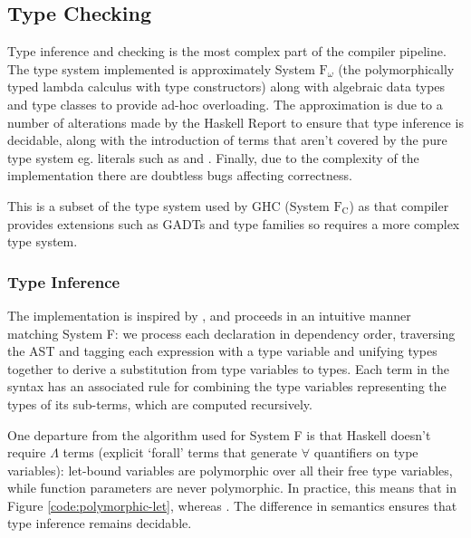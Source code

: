 \documentclass[dissertation.tex]{subfiles}
\begin{document}
{{{\begin{itemize}
{            }
            \end{itemize}

        }
    }
    \subsection{Type Checking}
    {

        Type inference and checking is the most complex part of the compiler pipeline. The type system implemented is
        approximately System \(\text{F}_\omega\) (the polymorphically typed lambda calculus with type constructors)
        along with algebraic data types and type classes to provide ad-hoc overloading. The approximation is due to a
        number of alterations made by the Haskell Report to ensure that type inference is decidable, along with the
        introduction of terms that aren't covered by the pure type system eg. literals such as  and
        . Finally, due to the complexity of the implementation there are doubtless bugs affecting
        correctness.
        
        This is a subset of the type system used by GHC (System \(\text{F}_\text{C}\)) as that compiler provides
        extensions such as GADTs and type families so requires a more complex type system.


        \subsubsection{Type Inference}
        {

            The implementation is inspired by \cite{THIH}, and proceeds in an intuitive manner matching System F: we
            process each declaration in dependency order, traversing the AST and tagging each expression with a type
            variable and unifying types together to derive a substitution from type variables to types. Each term in the
            syntax has an associated rule for combining the type variables representing the types of its sub-terms,
            which are computed recursively.

            One departure from the algorithm used for System F is that Haskell doesn't require \(\Lambda\) terms
            (explicit `forall' terms that generate \(\forall\) quantifiers on type variables): let-bound variables are
            polymorphic over all their free type variables, while function parameters are never polymorphic. In
            practice, this means that in Figure \ref{code:polymorphic-let},  whereas . The difference in semantics
            ensures that type inference remains decidable.
 
}}}
\end{document}
